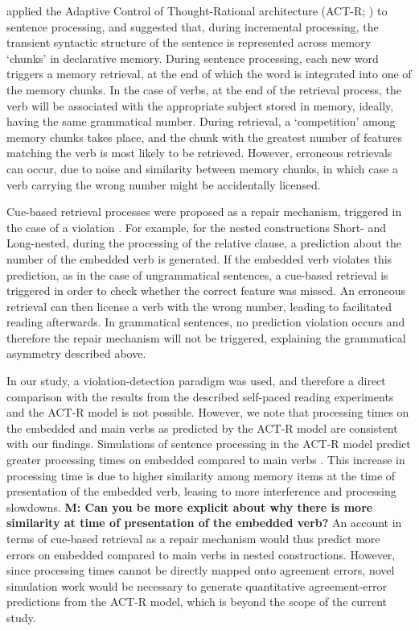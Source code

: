 \citet{lewis2005activation} applied the Adaptive Control of Thought-Rational architecture (ACT-R; \citet{anderson2013architecture}) to sentence processing, and suggested that, during incremental processing, the transient syntactic structure of the sentence is represented across memory `chunks’ in declarative memory. During sentence processing, each new word triggers a memory retrieval, at the end of which the word is integrated into one of the memory chunks. In the case of verbs, at the end of the retrieval process, the verb will be associated with the appropriate subject stored in memory, ideally, having the same grammatical number. During retrieval, a `competition' among memory chunks takes place, and the chunk with the greatest number of features matching the verb is most likely to be retrieved. However, erroneous retrievals can occur, due to  noise and similarity between memory chunks, in which case a verb carrying the wrong number might be accidentally licensed. 

Cue-based retrieval processes were proposed as a repair mechanism, triggered in the case of a violation \citep{wagers2009agreement, lago2015agreement}. For example, for the nested constructions Short- and Long-nested, during the processing of the relative clause, a prediction about the number of the embedded verb is generated. If the embedded verb violates this prediction, as in the case of ungrammatical sentences, a cue-based retrieval is triggered in order to check whether the correct feature was missed. An erroneous retrieval can then license a verb with the wrong number, leading to facilitated reading afterwards. In grammatical sentences, no prediction violation occurs and therefore the repair mechanism will not be triggered, explaining the grammatical asymmetry described above. 

In our study, a violation-detection paradigm was used, and therefore a direct comparison with the results from the described self-paced reading experiments and the ACT-R model is not possible. However, we note that processing times on the embedded and main verbs as predicted by the ACT-R model are consistent with our findings. Simulations of sentence processing in the ACT-R model predict greater processing times on embedded compared to main verbs \citep{lewis2005activation}. This increase in processing time is due to higher similarity among memory items at the time of presentation of the embedded verb, leasing to more interference and processing slowdowns. \textbf{M: Can you be more explicit about why there is more similarity at time of presentation of the embedded verb?} An account in terms of cue-based retrieval as a repair mechanism would thus predict more errors on embedded compared to main verbs in nested constructions.  However, since processing times cannot be directly mapped onto agreement errors, novel simulation work would be necessary to generate quantitative agreement-error predictions from the ACT-R model, which is beyond the scope of the current study.


